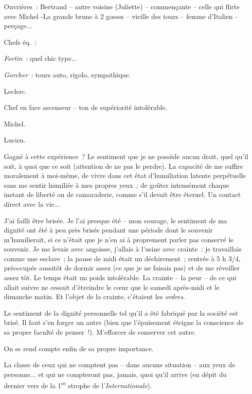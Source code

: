 \documentclass[french,twoside]{book} %
\begin{document}
Ouvrières : Bertrand – autre voisine (Juliette) – commençante – celle qui flirte avec Michel -La grande brune à 2 gosses – vieille des tours – femme d'Italien – perçage...\par
Chefs éq. :\par
{\itshape Fortin} : quel chic type...\par
{\itshape Gorcher} : tours auto, rigolo, sympathique.\par
Leclerc.\par
Chef en face ascenseur – ton de supériorité intolérable.\par
Michel.\par
Lucien.\par
Gagné à cette expérience ? Le sentiment que je ne possède aucun droit, quel qu'il soit, à quoi que ce soit (attention de ne pas le perdre). La capacité de me suffire moralement à moi-même, de vivre dans cet état d'humiliation latente perpétuelle sans me sentir humiliée à mes propres yeux ; de goûter intensément chaque instant de liberté ou de camaraderie, comme s'il devait être éternel. Un contact direct avec la vie...\par
J’ai failli être brisée. Je l'ai presque été – mon courage, le sentiment de ma dignité ont été à peu près brisés pendant une période dont le souvenir m'humilierait, si ce n'était que je n'en ai à proprement parler pas conservé le souvenir. Je me levais avec angoisse, j'allais à l'usine avec crainte : je travaillais comme une esclave ; la pause de midi était un déchirement ; rentrée à 5 h 3/4, préoccupée aussitôt de dormir assez (ce que je ne faisais pas) et de me réveiller assez tôt. Le temps était un poids intolérable. La crainte – la peur – de ce qui allait suivre ne cessait d'étreindre le cœur que le samedi après-midi et le dimanche matin. Et l'objet de la crainte, c'étaient les {\itshape ordres.}\par
Le sentiment de la dignité personnelle tel qu'il a été fabriqué par la société est brisé. Il faut s'en forger un autre (bien que l'épuisement éteigne la conscience de sa propre faculté de penser !). M'efforcer de conserver cet autre.\par
On se rend compte enfin de sa propre importance.\par
\par
La classe de ceux qui ne comptent pas – dans aucune situation – aux yeux de personne... et qui ne compteront pas, jamais, quoi qu'il arrive (en dépit du dernier vers de la 1\textsuperscript{re} strophe de l'{\itshape Internationale}).\par
\end{document}
